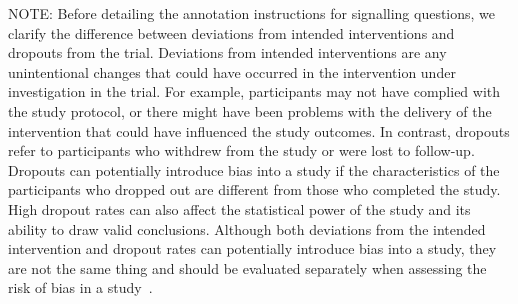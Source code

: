 \documentclass[sn-mathphys,Numbered]{sn-jnl}%
\begin{document}
NOTE: Before detailing the annotation instructions for signalling questions, we clarify the difference between deviations from intended interventions and dropouts from the trial.
Deviations from intended interventions are any unintentional changes that could have occurred in the intervention under investigation in the trial.
For example, participants may not have complied with the study protocol, or there might have been problems with the delivery of the intervention that could have influenced the study outcomes.
In contrast, dropouts refer to participants who withdrew from the study or were lost to follow-up.
Dropouts can potentially introduce bias into a study if the characteristics of the participants who dropped out are different from those who completed the study.
High dropout rates can also affect the statistical power of the study and its ability to draw valid conclusions.
Although both deviations from the intended intervention and dropout rates can potentially introduce bias into a study, they are not the same thing and should be evaluated separately when assessing the risk of bias in a study~\cite{imel2013meta,cedenilla2023psychosocial}.
%
%
%
\end{document}
